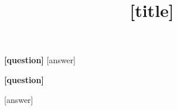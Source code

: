 \documentclass[11pt]{article}
\title{[title]}
\author{}
\date{}
\begin{document}
\maketitle
\thispagestyle{fancy}

\vspace{-6em}

\begin{flushleft}
\textbf{[question]} [answer]\\
\end{flushleft}

\begin{samepage}\vspace{5pt}
\begin{flushleft}
\textbf{[question]}
\end{flushleft}
\vspace{5pt}

[answer]

\end{samepage}
\end{document}
